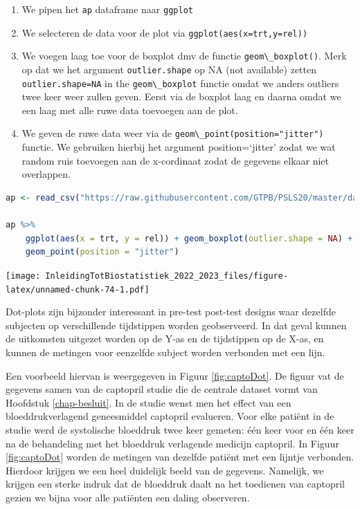 \documentclass[
  12pt,dutch,coursenotes]{book}
\newcommand{\passthrough}[1]{#1}
\providecommand{\tightlist}{%
  \setlength{\itemsep}{0pt}\setlength{\parskip}{0pt}}
\begin{document}
\begin{enumerate}
\def\labelenumi{\arabic{enumi}.}
\tightlist
\item
  We pipen het \passthrough{\lstinline!ap!} dataframe naar \passthrough{\lstinline!ggplot!}
\item
  We selecteren de data voor de plot via \passthrough{\lstinline!ggplot(aes(x=trt,y=rel))!}
\item
  We voegen laag toe voor de boxplot dmv de functie \passthrough{\lstinline!geom\_boxplot()!}. Merk op dat we het argument \passthrough{\lstinline!outlier.shape!} op NA (not available) zetten \passthrough{\lstinline!outlier.shape=NA!} in the \passthrough{\lstinline!geom\_boxplot!} functie omdat we anders outliers twee keer weer zullen geven. Eerst via de boxplot laag en daarna omdat we een laag met alle ruwe data toevoegen aan de plot.
\item
  We geven de ruwe data weer via de \passthrough{\lstinline!geom\_point(position="jitter")!} functie. We gebruiken hierbij het argument position=`jitter' zodat we wat random ruis toevoegen aan de x-cordinaat zodat de gegevens elkaar niet overlappen.
\end{enumerate}

\begin{lstlisting}[language=R]
ap <- read_csv("https://raw.githubusercontent.com/GTPB/PSLS20/master/data/armpit.csv")

ap %>%
    ggplot(aes(x = trt, y = rel)) + geom_boxplot(outlier.shape = NA) +
    geom_point(position = "jitter")
\end{lstlisting}

\texttt{[image: InleidingTotBiostatistiek\_2022\_2023\_files/figure-latex/unnamed-chunk-74-1.pdf]}

Dot-plots zijn bijzonder interessant in pre-test post-test designs waar dezelfde subjecten op
verschillende tijdstippen worden geobserveerd. In dat geval kunnen de uitkomsten
uitgezet worden op de Y-as en de tijdstippen op de X-as, en kunnen de
metingen voor eenzelfde subject worden verbonden met een lijn.

Een
voorbeeld hiervan is weergegeven in Figuur \ref{fig:captoDot}. De figuur vat de gegevens samen van de captopril studie die de centrale dataset vormt van Hoofdstuk \ref{chap-besluit}. In de studie wenst men het effect van een bloeddrukverlagend geneesmiddel captopril evalueren. Voor elke patiënt in de studie werd de systolische bloeddruk twee keer gemeten: één keer voor en één keer na de behandeling met het bloeddruk verlagende medicijn captopril. In Figuur \ref{fig:captoDot} worden de metingen van dezelfde patiënt met een lijntje verbonden. Hierdoor krijgen we een heel duidelijk beeld van de gegevens. Namelijk, we krijgen een sterke indruk dat de bloeddruk daalt na het toedienen van captopril gezien we bijna voor alle patiënten een daling observeren.
\end{document}
